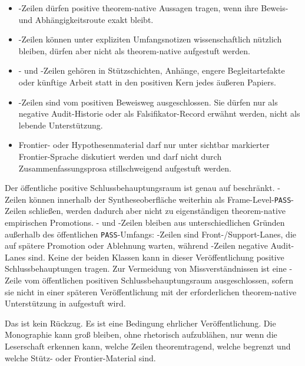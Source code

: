 \begin{itemize}
\item {}-Zeilen dürfen positive theorem-native
      Aussagen tragen, wenn ihre Beweis- und Abhängigkeitsroute exakt bleibt.
\item {}-Zeilen können unter expliziten Umfangsnotizen
      wissenschaftlich nützlich bleiben, dürfen aber nicht als theorem-native
      aufgestuft werden.
\item {}- und -Zeilen gehören in
      Stützschichten, Anhänge, engere Begleitartefakte oder künftige Arbeit
      statt in den positiven Kern jedes äußeren Papiers.
\item {}-Zeilen sind vom positiven Beweisweg ausgeschlossen.
      Sie dürfen nur als negative Audit-Historie oder als Falsifikator-Record
      erwähnt werden, nicht als lebende Unterstützung.
\item Frontier- oder Hypothesenmaterial darf nur unter sichtbar markierter
      Frontier-Sprache diskutiert werden und darf nicht durch
      Zusammenfassungsprosa stillschweigend aufgestuft werden.
\end{itemize}

Der öffentliche positive Schlussbehauptungsraum ist genau auf
 beschränkt. -Zeilen können
innerhalb der Syntheseoberfläche weiterhin als Frame-Level-\texttt{PASS}-Zeilen
schließen, werden dadurch aber nicht zu eigenständigen theorem-native
empirischen Promotions. - und -Zeilen
bleiben aus unterschiedlichen Gründen außerhalb des öffentlichen
\texttt{PASS}-Umfangs: -Zeilen sind Front-/Support-Lanes, die
auf spätere Promotion oder Ablehnung warten, während
-Zeilen negative Audit-Lanes sind. Keine der beiden Klassen
kann in dieser Veröffentlichung positive Schlussbehauptungen tragen.
Zur Vermeidung von Missverständnissen ist eine 
-Zeile vom öffentlichen positiven Schlussbehauptungsraum
ausgeschlossen, sofern sie nicht in einer späteren Veröffentlichung mit der
erforderlichen theorem-native Unterstützung in 
aufgestuft wird.

Das ist kein Rückzug. Es ist eine Bedingung ehrlicher Veröffentlichung. Die
Monographie kann groß bleiben, ohne rhetorisch aufzublähen, nur wenn die
Leserschaft erkennen kann, welche Zeilen theoremtragend, welche begrenzt und
welche Stütz- oder Frontier-Material sind.

